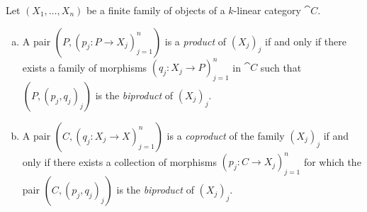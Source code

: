 \begin{theorem}
    \label{thm:product-iff-admits-biproduct}
    Let \((X_1, \dots, X_n)\) be a finite family of objects of a \(k\)-linear
    category \(\cat C\).
    \begin{enumerate}[(a)]\setlength\itemsep{0em}
        \item A pair \((P, (p_j: P \to X_j)_{j=1}^n)\) is a \emph{product} of
              \((X_j)_j\) if and only if there exists a family of morphisms
              \((q_j: X_j \to P)_{j=1}^n\) in \(\cat C\) such that \((P, (p_j, q_j)_j)\) is
              the \emph{biproduct} of \((X_j)_j\).

        \item A pair \((C, (q_j: X_j \to X)_{j=1}^n)\) is a \emph{coproduct} of the family
              \((X_j)_j\) if and only if there exists a collection of morphisms
              \((p_j: C \to X_j)_{j=1}^n\) for which the pair \((C, (p_j, q_j)_j)\) is the
              \emph{biproduct} of \((X_j)_j\).
    \end{enumerate}
\end{theorem}

